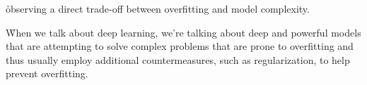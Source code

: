 \r{observing a direct trade-off between overfitting and model complexity.}

\r{When we talk about deep learning, we're talking about deep and powerful models that are attempting to solve complex problems that are prone to overfitting and thus usually employ additional countermeasures, such as regularization, to help prevent overfitting.}



